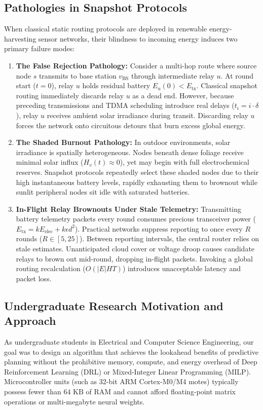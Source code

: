 \documentclass[journal]{IEEEtran}
\begin{document}
\subsection{Pathologies in Snapshot Protocols}
When classical static routing protocols are deployed in renewable energy-harvesting sensor networks, their blindness to incoming energy induces two primary failure modes:

\begin{enumerate}
    \item \textbf{The False Rejection Pathology:} Consider a multi-hop route where source node $s$ transmits to base station $v_{\text{BS}}$ through intermediate relay $u$. At round start ($t=0$), relay $u$ holds residual battery $E_u(0) < E_{\text{tx}}$. Classical snapshot routing immediately discards relay $u$ as a dead end. However, because preceding transmissions and TDMA scheduling introduce real delays ($t_i = i \cdot \delta$), relay $u$ receives ambient solar irradiance during transit. Discarding relay $u$ forces the network onto circuitous detours that burn excess global energy.
    \item \textbf{The Shaded Burnout Pathology:} In outdoor environments, solar irradiance is spatially heterogeneous. Nodes beneath dense foliage receive minimal solar influx ($H_v(t) \approx 0$), yet may begin with full electrochemical reserves. Snapshot protocols repeatedly select these shaded nodes due to their high instantaneous battery levels, rapidly exhausting them to brownout while sunlit peripheral nodes sit idle with saturated batteries.
    \item \textbf{In-Flight Relay Brownouts Under Stale Telemetry:} Transmitting battery telemetry packets every round consumes precious transceiver power ($E_{\text{tx}} = k E_{\text{elec}} + k \epsilon d^2$). Practical networks suppress reporting to once every $R$ rounds ($R \in [5, 25]$). Between reporting intervals, the central router relies on stale estimates. Unanticipated cloud cover or voltage droop causes candidate relays to brown out mid-round, dropping in-flight packets. Invoking a global routing recalculation ($O(|E|HT)$) introduces unacceptable latency and packet loss.
\end{enumerate}

\subsection{Undergraduate Research Motivation and Approach}
As undergraduate students in Electrical and Computer Science Engineering, our goal was to design an algorithm that achieves the lookahead benefits of predictive planning without the prohibitive memory, compute, and energy overhead of Deep Reinforcement Learning (DRL) or Mixed-Integer Linear Programming (MILP). Microcontroller units (such as 32-bit ARM Cortex-M0/M4 motes) typically possess fewer than $64\text{ KB}$ of RAM and cannot afford floating-point matrix operations or multi-megabyte neural weights.
\end{document}

